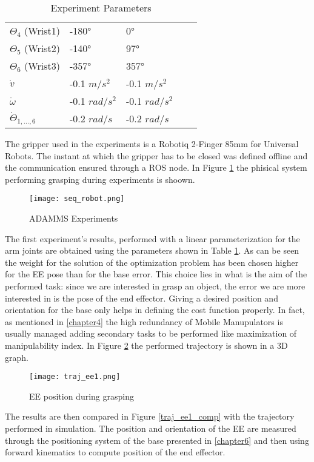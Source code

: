 \begin{table}[]
\begin{tabular}{|l|l|l|ll}
	$\Theta_4$ (Wrist1) 		&  -180° 						&  0°		 			\\ \cline{1-3}
	$\Theta_5$ (Wrist2)			&  -140° 						&  97°		 			\\ \cline{1-3} 
	$\Theta_6$ (Wrist3) 		&  -357° 						&  357°		 			\\ \cline{1-3}
	$\dot{v}$ 			 		&  -0.1 $m/s^2$					&  -0.1 $m/s^2$ 		\\ \cline{1-3}
	$\dot{\omega}$		 		&  -0.1 $rad/s^2$ 				&  -0.1 $rad/s^2$		\\ \cline{1-3}
	$\dot{\Theta}_{1,\dots,6}$	&  -0.2 $rad/s$					&  -0.2 $rad/s$ 		\\ \cline{1-3}
	\end{tabular}
	\caption{Experiment Parameters}
	\label{tableparam1}
	\end{table}
	The gripper used in the experiments is a Robotiq 2-Finger 85mm for Universal Robots. The instant at which the gripper has to be closed was defined offline and the communication ensured through a ROS node. In Figure \ref{seq_robot} the phisical system performing grasping during experiments is shoown.
	\begin{figure}[h!]
	\centering
	\texttt{[image: seq\_robot.png]}
	\caption{ADAMMS Experiments}
	\label{seq_robot}
	\end{figure}
	The first experiment's results, performed with a linear parameterization for the arm joints are obtained using the parameters shown in Table \ref{tableparam1}. As can be seen the weight for the solution of the optimization problem has been chosen higher for the EE pose than for the base error. This choice lies in what is the aim of the performed task: since we are interested in grasp an object, the error we are more interested in is the pose of the end effector. Giving a desired position and orientation for the base only helps in defining the cost function properly. In fact, as mentioned in \ref{chapter4} the high redundancy of Mobile Manupulators is usually managed adding secondary tasks to be performed like maximization of manipulability index. 
	In Figure \ref{traj_ee1} the performed trajectory is shown in a 3D graph. 
	\begin{figure}[h!]
	\centering
	\texttt{[image: traj\_ee1.png]}
	\caption{EE position during grasping}
	\label{traj_ee1}
	\end{figure}
	The results are then compared in Figure \ref{traj_ee1_comp} with the trajectory performed in simulation. The position and orientation of the EE are measured through the positioning system of the base presented in \ref{chapter6} and then using forward kinematics to compute position of the end effector. 
